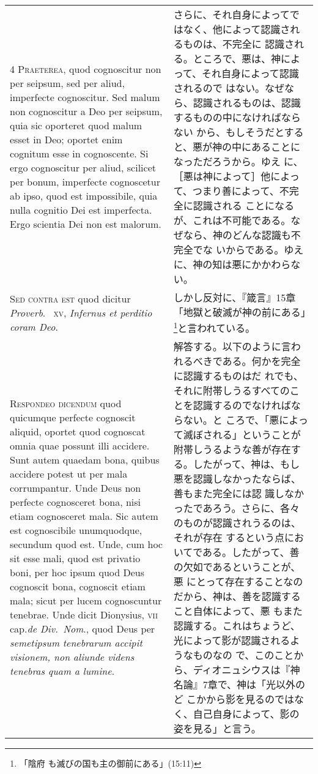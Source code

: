 \documentclass[10pt]{jsarticle} %
\begin{document}
\begin{longtable}{p{21em}p{21em}}
\\


{\scshape 4 Praeterea}, quod cognoscitur non per seipsum, sed per
aliud, imperfecte cognoscitur. Sed malum non cognoscitur a Deo per
seipsum, quia sic oporteret quod malum esset in Deo; oportet enim
cognitum esse in cognoscente. Si ergo cognoscitur per aliud, scilicet
per bonum, imperfecte cognoscetur ab ipso, quod est impossibile, quia
nulla cognitio Dei est imperfecta. Ergo scientia Dei non est malorum.

&

さらに、それ自身によってではなく、他によって認識されるものは、不完全に
認識される。ところで、悪は、神によって、それ自身によって認識されるので
はない。なぜなら、認識されるものは、認識するものの中になければならない
から、もしそうだとすると、悪が神の中にあることになっただろうから。ゆえ
に、［悪は神によって］他によって、つまり善によって、不完全に認識される
ことになるが、これは不可能である。なぜなら、神のどんな認識も不完全でな
いからである。ゆえに、神の知は悪にかかわらない。


\\


{\scshape Sed contra est} quod dicitur {\itshape Proverb}.~{\scshape
xv}, {\itshape Infernus et perditio coram Deo}.

&

しかし反対に、『箴言』15章「地獄と破滅が神の前にある」\footnote{「陰府
も滅びの国も主の御前にある」(15:11)}と言われている。


\\


{\scshape Respondeo dicendum} quod quicumque perfecte cognoscit
aliquid, oportet quod cognoscat omnia quae possunt illi accidere. Sunt
autem quaedam bona, quibus accidere potest ut per mala
corrumpantur. Unde Deus non perfecte cognosceret bona, nisi etiam
cognosceret mala. Sic autem est cognoscibile unumquodque, secundum
quod est. Unde, cum hoc sit esse mali, quod est privatio boni, per hoc
ipsum quod Deus cognoscit bona, cognoscit etiam mala; sicut per lucem
cognoscuntur tenebrae. Unde dicit Dionysius, {\scshape vii}
cap.{\itshape de Div.~Nom}., quod Deus per {\itshape semetipsum
tenebrarum accipit visionem, non aliunde videns tenebras quam a
lumine}.

&

解答する。以下のように言われるべきである。何かを完全に認識するものはだ
れでも、それに附帯しうるすべてのことを認識するのでなければならない。と
ころで、「悪によって滅ぼされる」ということが附帯しうるような善が存在す
る。したがって、神は、もし悪を認識しなかったならば、善もまた完全には認
識しなかったであろう。さらに、各々のものが認識されうるのは、それが存在
するという点においてである。したがって、善の欠如であるということが、悪
にとって存在することなのだから、神は、善を認識すること自体によって、悪
もまた認識する。これはちょうど、光によって影が認識されるようなものなの
で、このことから、ディオニュシウスは『神名論』7章で、神は「光以外のど
こかから影を見るのではなく、自己自身によって、影の姿を見る」と言う。


\end{longtable}
\end{document}
